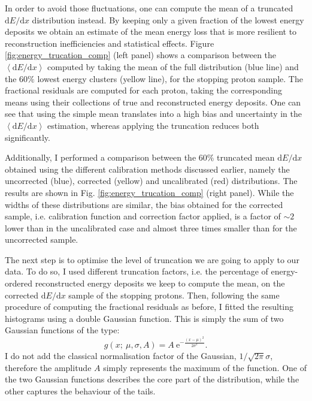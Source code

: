 In order to avoid those fluctuations, one can compute the mean of a truncated $\mathrm{d}E/\mathrm{d}x$ distribution instead. By keeping only a given fraction of the lowest energy deposits we obtain an estimate of the mean energy loss that is more resilient to reconstruction inefficiencies and statistical effects. Figure \ref{fig:energy_trucation_comp} (left panel) shows a comparison between the $\left<\mathrm{d}E/\mathrm{d}x\right>$ computed by taking the mean of the full distribution (blue line) and the $60\%$ lowest energy clusters (yellow line), for the stopping proton sample. The fractional residuals are computed for each proton, taking the corresponding means using their collections of true and reconstructed energy deposits. One can see that using the simple mean translates into a high bias and uncertainty in the $\left<\mathrm{d}E/\mathrm{d}x\right>$ estimation, whereas applying the truncation reduces both significantly.

Additionally, I performed a comparison between the $60\%$ truncated mean $\mathrm{d}E/\mathrm{d}x$ obtained using the different calibration methods discussed earlier, namely the uncorrected (blue), corrected (yellow) and uncalibrated (red) distributions. The results are shown in Fig. \ref{fig:energy_trucation_comp} (right panel). While the widths of these distributions are similar, the bias obtained for the corrected sample, i.e. calibration function and correction factor applied, is a factor of $\sim2$ lower than in the uncalibrated case and almost three times smaller than for the uncorrected sample.

The next step is to optimise the level of truncation we are going to apply to our data. To do so, I used different truncation factors, i.e. the percentage of energy-ordered reconstructed energy deposits we keep to compute the mean, on the corrected $\mathrm{d}E/\mathrm{d}x$ sample of the stopping protons. Then, following the same procedure of computing the fractional residuals as before, I fitted the resulting histograms using a double Gaussian function. This is simply the sum of two Gaussian functions of the type:
\begin{equation}
	g(x;~\mu, \sigma, A) = A~\mathrm{e}^{-\frac{(x-\mu)^{2}}{2\sigma^{2}}}.
\end{equation}
I do not add the classical normalisation factor of the Gaussian, $1/\sqrt{2\pi}\sigma$, therefore the amplitude $A$ simply represents the maximum of the function. One of the two Gaussian functions describes the core part of the distribution, while the other captures the behaviour of the tails.


